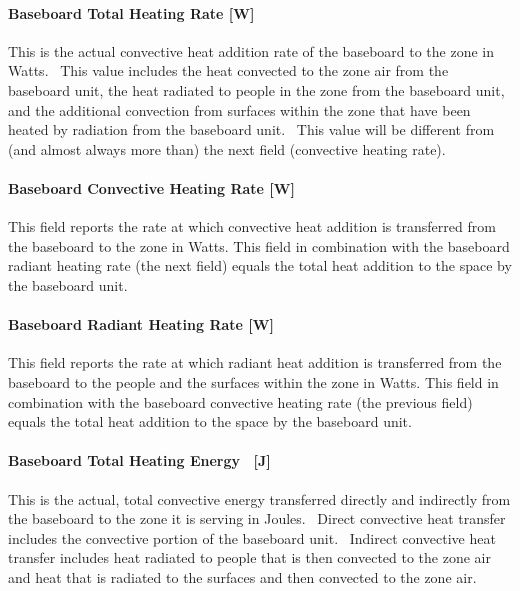 \paragraph{Baseboard Total Heating Rate {[}W{]}}\label{baseboard-total-heating-rate-w-000}

This is the actual convective heat addition rate of the baseboard to the zone in Watts.~ This value includes the heat convected to the zone air from the baseboard unit, the heat radiated to people in the zone from the baseboard unit, and the additional convection from surfaces within the zone that have been heated by radiation from the baseboard unit.~ This value will be different from (and almost always more than) the next field (convective heating rate).

\paragraph{Baseboard Convective Heating Rate {[}W{]}}\label{baseboard-convective-heating-rate-w-000}

This field reports the rate at which convective heat addition is transferred from the baseboard to the zone in Watts.  This field in combination with the baseboard radiant heating rate (the next field) equals the total heat addition to the space by the baseboard unit.

\paragraph{Baseboard Radiant Heating Rate {[}W{]}}\label{baseboard-radiant-heating-rate-w-000}

This field reports the rate at which radiant heat addition is transferred from the baseboard to the people and the surfaces within the zone in Watts.  This field in combination with the baseboard convective heating rate (the previous field) equals the total heat addition to the space by the baseboard unit.

\paragraph{Baseboard Total Heating Energy ~{[}J{]}}\label{baseboard-total-heating-energy-j-000}

This is the actual, total convective energy transferred directly and indirectly from the baseboard to the zone it is serving in Joules.~ Direct convective heat transfer includes the convective portion of the baseboard unit.~ Indirect convective heat transfer includes heat radiated to people that is then convected to the zone air and heat that is radiated to the surfaces and then convected to the zone air.

